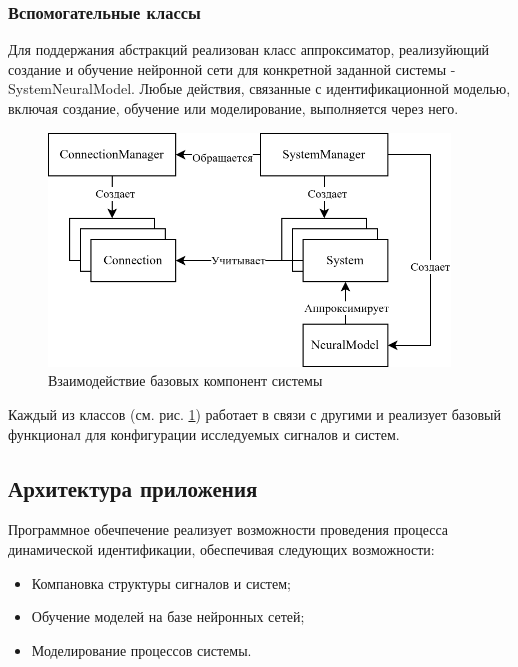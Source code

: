 \subsubsection{Вспомогательные классы}

Для поддержания абстракций реализован класс аппроксиматор, реализуйющий создание
и обучение нейронной сети для конкретной заданной системы - SystemNeuralModel.
Любые действия, связанные с идентификационной моделью, включая создание,
обучение или моделирование, выполняется через него. 

\begin{figure}[H]
  \begin{center}
    \includegraphics[width=0.95\textwidth]{figures/basics_relations.png}
  \end{center}
  \caption{Взаимодействие базовых компонент
  системы}\label{fig:basics:components}
\end{figure}

Каждый из классов (см. рис. \ref{fig:basics:components}) работает в связи с
другими и реализует базовый функционал для конфигурации исследуемых сигналов и
систем.

\subsection{Архитектура приложения}

Программное обечпечение реализует возможности проведения процесса динамической
идентификации, обеспечивая следующих возможности:
\begin{itemize}
  \item Компановка структуры сигналов и систем;
  \item Обучение моделей на базе нейронных сетей;
  \item Моделирование процессов системы.
\end{itemize}


